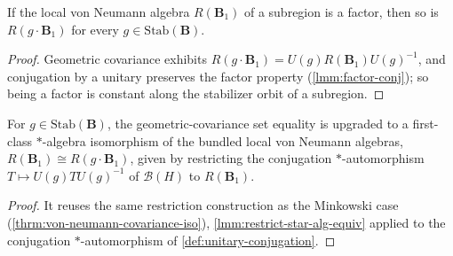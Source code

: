 \begin{theorem}
    \label{thrm:von-neumann-factor-orbit-in-curved-spacetime}
    \leanok
    If the local von Neumann algebra $R(\mathbf{B}_1)$ of a subregion is a factor, then so is $R(g \cdot \mathbf{B}_1)$ for every $g \in \mathrm{Stab}(\mathbf{B})$.
\end{theorem}
\begin{proof}
    \leanok
    Geometric covariance exhibits $R(g \cdot \mathbf{B}_1) = U(g) R(\mathbf{B}_1) U(g)^{-1}$, and conjugation by a unitary preserves the factor property (\ref{lmm:factor-conj}); so being a factor is constant along the stabilizer orbit of a subregion.
\end{proof}

\begin{theorem}
    \label{thrm:von-neumann-covariance-iso-in-curved-spacetime}
    \leanok
    For $g \in \mathrm{Stab}(\mathbf{B})$, the geometric-covariance set equality is upgraded to a first-class $*$-algebra isomorphism of the bundled local von Neumann algebras, $R(\mathbf{B}_1) \cong R(g \cdot \mathbf{B}_1)$, given by restricting the conjugation $*$-automorphism $T \mapsto U(g) T U(g)^{-1}$ of $\mathcal{B}(H)$ to $R(\mathbf{B}_1)$.
\end{theorem}
\begin{proof}
    \leanok
    It reuses the same restriction construction as the Minkowski case (\ref{thrm:von-neumann-covariance-iso}), \ref{lmm:restrict-star-alg-equiv} applied to the conjugation $*$-automorphism of \ref{def:unitary-conjugation}.
\end{proof}

